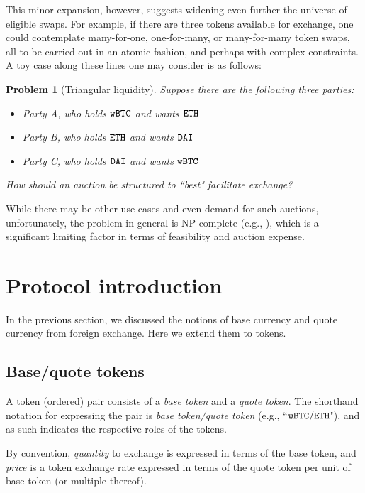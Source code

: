 \documentclass[11pt, reqno]{amsart}
\newtheorem{problem}[thm]{Problem}
\newcommand{\BTC}{\textnormal{\texttt{wBTC}}}
\newcommand{\ETH}{\textnormal{\texttt{ETH}}}
\newcommand{\DAI}{\textnormal{\texttt{DAI}}}
\begin{document}
This minor expansion, however, suggests widening even further the universe of
eligible swaps. For example, if there are three tokens available for exchange,
one could contemplate many-for-one, one-for-many, or many-for-many token swaps,
all to be carried out in an atomic fashion, and perhaps with complex
constraints. A toy case along these lines one may consider is as follows:
\begin{problem}[Triangular liquidity]
Suppose there are the following three parties:
\begin{itemize}
	\item Party A, who holds $\BTC$ and wants $\ETH$
	\item Party B, who holds $\ETH$ and wants $\DAI$
	\item Party C, who holds $\DAI$ and wants $\BTC$
\end{itemize}
How should an auction be structured to ``best" facilitate exchange?
\end{problem}
While there may be other use cases and even demand for such auctions,
unfortunately, the problem in general is NP-complete (e.g., \cite{XiStWh05}),
which is a significant limiting factor in terms of feasibility and
auction expense.


\section{Protocol introduction}
In the previous section, we discussed the notions of base currency and
quote currency from foreign exchange. Here we extend them to tokens.

\subsection{Base/quote tokens}
A token (ordered) pair consists of a \emph{base token} and a
\emph{quote token}. The shorthand notation for expressing the pair is
\emph{base token/quote token} (e.g., ``$\BTC/\ETH$"), and as such indicates the
respective roles of the tokens.

By convention, \emph{quantity} to exchange is expressed in terms of the base
token, and \emph{price} is a token exchange rate expressed in terms of the
quote token per unit of base token (or multiple thereof).
\end{document}
